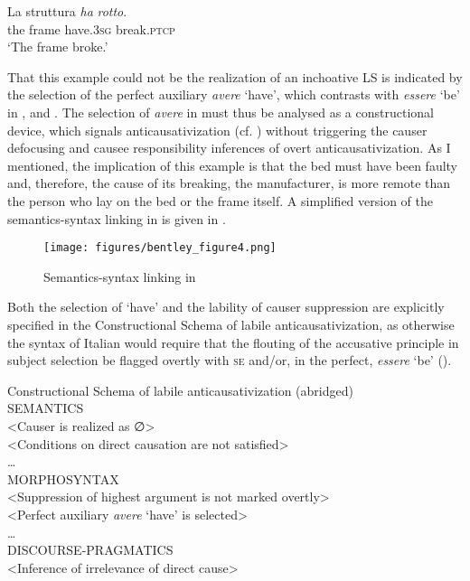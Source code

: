 \documentclass[output=paper,colorlinks,citecolor=brown
]{langscibook}
\begin{document}
\ea \label{bentley_example_59}
\gll La		struttura	\textit{ha}			\textit{rotto}. \\
	 the		frame	have.3\textsc{sg}	break.\textsc{ptcp}	\\
\glt ‘The frame broke.’
\z

That this example could not be the realization of an inchoative LS is indicated by the selection of the perfect auxiliary \textit{avere} ‘have’, which contrasts with \textit{essere} ‘be’ in ,  and . The selection of \textit{avere} in  must thus be analysed as a constructional device, which signals anticausativization (cf. ) without triggering the causer defocusing and causee responsibility inferences of overt anticausativization. As I mentioned, the implication of this example is that the bed must have been faulty and, therefore, the cause of its breaking, the manufacturer, is more remote than the person who lay on the bed or the frame itself. A simplified version of the semantics-syntax linking in  is given in .

\begin{figure}
\texttt{[image: figures/bentley\_figure4.png]}
\caption{Semantics-syntax linking in }
\label{fig:bentley_figure_4}
\end{figure}    

Both the selection of ‘have’ and the lability of causer suppression are explicitly specified in the Constructional Schema of labile anticausativization, as otherwise the syntax of Italian would require that the flouting of the accusative principle in subject selection be flagged overtly with \textsc{se} and/or, in the perfect, \textit{essere} ‘be’ ().

\ea  \label{bentley_example_60}
Constructional Schema of labile anticausativization (abridged)\\
SEMANTICS\\
<Causer is realized as ∅>\\
<Conditions on direct causation are not satisfied>\\
 \ldots \\
MORPHOSYNTAX\\
<Suppression of highest argument is not marked overtly>\\
<Perfect auxiliary \textit{avere} ‘have’ is selected>\\
 \ldots \\
DISCOURSE-PRAGMATICS\\
<Inference of irrelevance of direct cause>
\z
\end{document}
